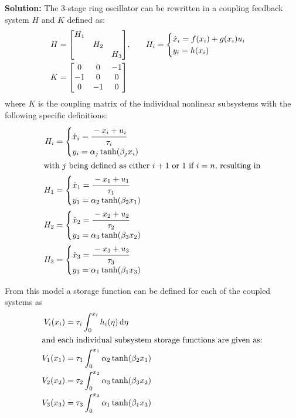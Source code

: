 \documentclass[letter]{article}
\begin{document}
\noindent
\textbf{Solution:}
The 3-stage ring oscillator can be rewritten in a coupling feedback system $H$ and $K$ defined as:
\begin{align}
	H &= \mqty[\dmat{H_1}{H_2}{H_3}], \hspace{0.25in}
	H_i
	=\begin{cases}
		\dot{x}_i = f(x_i) + g(x_i) u_i\\
		y_i = h(x_i)
	\end{cases}\\
	K &= \mqty[	 0 	& 0 &-1\\
				-1 	& 0 & 0\\
				0 	&-1 & 0]
\end{align}
where $K$ is the coupling matrix of the individual nonlinear subsystems with the following specific definitions:
\begin{align}
	H_i &=\begin{cases}
		\dot{x}_i = \cfrac{-x_i + u_i}{\tau_i}\\
		y_i = \alpha_j \tanh(\beta_j x_i)
	\end{cases}\\
	\intertext{with $j$ being defined as either $i+1$ or $1$ if $i=n$, resulting in}
	H_1 &=\begin{cases}
		\dot{x}_1 = \cfrac{-x_1 + u_1}{\tau_1}\\
		y_1 = \alpha_2 \tanh(\beta_2 x_1)
	\end{cases}\\
	H_2 &=\begin{cases}
		\dot{x}_2 = \cfrac{-x_2 + u_2}{\tau_2}\\
		y_2 = \alpha_3 \tanh(\beta_3 x_2)
	\end{cases}\\
	H_3 &=\begin{cases}
		\dot{x}_3 = \cfrac{-x_3 + u_3}{\tau_3}\\
		y_3 = \alpha_1 \tanh(\beta_1 x_3)
	\end{cases}
\end{align}

\newpage
From this model a storage function can be defined for each of the coupled systems as
\begin{align}
	V_i(x_i) &= \tau_i \int_0^{x_i} h_i(\eta) \dd{\eta}\\
	\intertext{and each individual subsystem storage functions are given as:}
	V_1(x_1) &= \tau_1 \int_0^{x_1} \alpha_2 \tanh(\beta_2 x_1)\\
	V_2(x_2) &= \tau_2 \int_0^{x_2} \alpha_3 \tanh(\beta_3 x_2)\\
	V_3(x_3) &= \tau_3 \int_0^{x_3} \alpha_1 \tanh(\beta_1 x_3)
\end{align}
\end{document}
